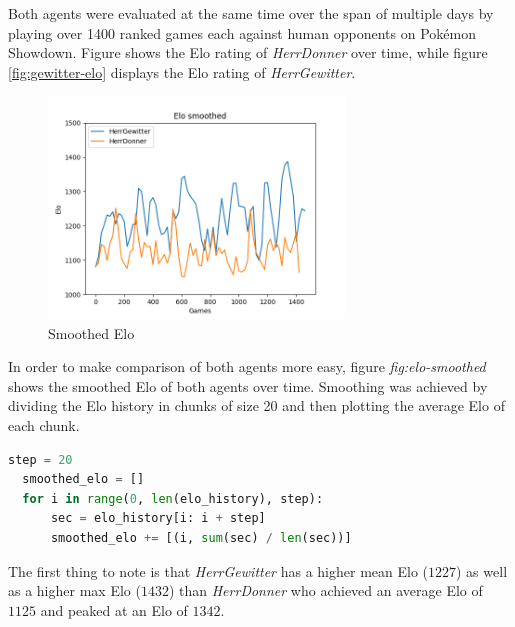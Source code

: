 Both agents were evaluated at the same time over the span of multiple days by playing over 1400 ranked games each 
against human opponents on Pokémon Showdown. Figure  shows the Elo rating of \textit{HerrDonner}
over time, while figure \ref{fig:gewitter-elo} displays the Elo rating of \textit{HerrGewitter}. 
\begin{figure}[h]
	\centering
	\includegraphics[width=0.7\textwidth]{images/Smoothed-Elo-Time.png}
	\caption{Smoothed Elo}
	\label{fig:elo-smoothed}
\end{figure}
In order to make comparison of both agents more easy, figure \textit{fig:elo-smoothed} shows the smoothed Elo of
both agents over time. Smoothing was achieved by dividing the Elo history in chunks of size 20 and then plotting
the average Elo of each chunk. 
\\\begin{minipage}{\linewidth}
\begin{lstlisting}[language=Python, caption=Smoothing Elo values]
  step = 20
  smoothed_elo = []
  for i in range(0, len(elo_history), step):
      sec = elo_history[i: i + step]
      smoothed_elo += [(i, sum(sec) / len(sec))]
\end{lstlisting}
\end{minipage}
The first thing to note is that \textit{HerrGewitter} has a higher mean Elo ($1227$) as well as a higher max Elo ($1432$)
than \textit{HerrDonner} who achieved an average Elo of $1125$ and peaked at an Elo of $1342$. 
